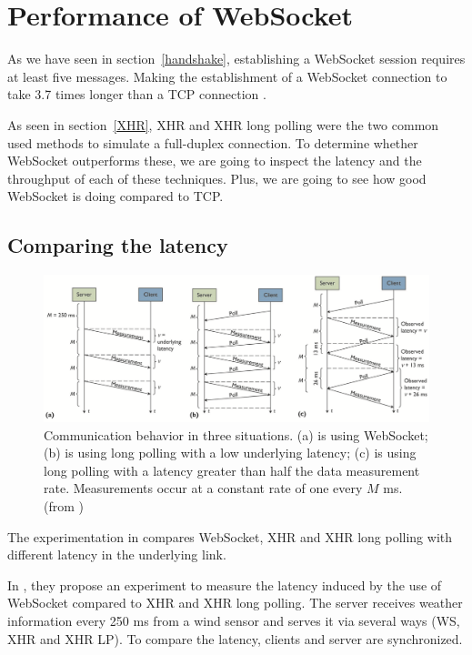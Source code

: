 \documentclass[10pt,journal,compsoc]{IEEEtran}
\newcommand{\ws}{WebSocket}
\begin{document}
\section{Performance of \ws{}}

As we have seen in section~\ref{handshake}, establishing a \ws{} session requires at least five messages.
Making the establishment of a \ws{} connection to take 3.7 times longer than a TCP connection \cite{performanceEvaluationOfWebsocketProtocol}. 

As seen in section~\ref{XHR}, XHR and XHR long polling were the two common used methods to simulate a full-duplex connection.
To determine whether \ws{} outperforms these, we are going to inspect the latency and the throughput of each of these techniques.
Plus, we are going to see how good \ws{} is doing compared to TCP.

\subsection{Comparing the latency}

\begin{figure}[!t]
    \centering
    \includegraphics[width=\textwidth]{comdisp.png}
    \caption{Communication behavior in three situations. (a) is using \ws{}; (b) is using long polling with a low underlying latency; (c) is using long polling with a latency greater than half the data measurement rate. Measurements occur at a constant rate of one every $M$ ms. (from \cite{communicationAndDIsplayingRealTimeDataWithWebSocket})}
    \label{fig:comdisp}
\end{figure}

The experimentation in  compares \ws{}, XHR and XHR long polling with different latency in the underlying link.

In \cite{communicationAndDIsplayingRealTimeDataWithWebSocket}, they propose an experiment to measure the latency induced by the use of \ws{} compared to XHR and XHR long polling.
The server receives weather information every 250 ms from a wind sensor and serves it via several ways (WS, XHR and XHR LP).
To compare the latency, clients and server are synchronized.
\end{document}
